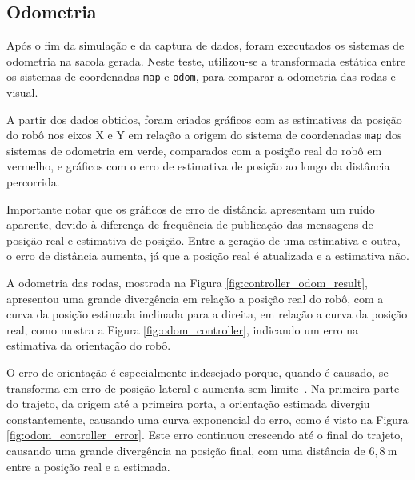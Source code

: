 \documentclass[repeatfields,xlists,xpacks,oneside,yearsonly]{ufrgscca}
\begin{document}
\subsection{Odometria}

Após o fim da simulação e da captura de dados, foram executados os
sistemas de odometria na sacola gerada. Neste teste, utilizou-se a
transformada estática entre os sistemas de coordenadas \texttt{map} e
\texttt{odom}, para comparar a odometria das rodas e visual.

A partir dos dados obtidos, foram criados gráficos com as estimativas
da posição do robô nos eixos X e Y em relação a origem do sistema de
coordenadas \texttt{map} dos sistemas de odometria em verde,
comparados com a posição real do robô em vermelho, e gráficos com o
erro de estimativa de posição ao longo da distância percorrida.

Importante notar que os gráficos de erro de distância apresentam um
ruído aparente, devido à diferença de frequência de publicação das
mensagens de posição real e estimativa de posição. Entre a geração de
uma estimativa e outra, o erro de distância aumenta, já que a posição
real é atualizada e a estimativa não.

A odometria das rodas, mostrada na Figura
\ref{fig:controller_odom_result}, apresentou uma grande divergência
em relação a posição real do robô, com a curva da posição estimada
inclinada para a direita, em relação a curva da posição real, como
mostra a Figura \ref{fig:odom_controller}, indicando um erro na
estimativa da orientação do robô.

O erro de orientação é especialmente indesejado porque, quando é
causado, se transforma em erro de posição lateral e aumenta sem
limite~\cite{borenstein}. Na primeira parte do trajeto, da origem até
a primeira porta, a orientação estimada divergiu constantemente,
causando uma curva exponencial do erro, como é visto na Figura
\ref{fig:odom_controller_error}. Este erro continuou crescendo até o
final do trajeto, causando uma grande divergência na posição final,
com uma distância de $6,8~\si{\meter}$ entre a posição real e a
estimada.
\end{document}
